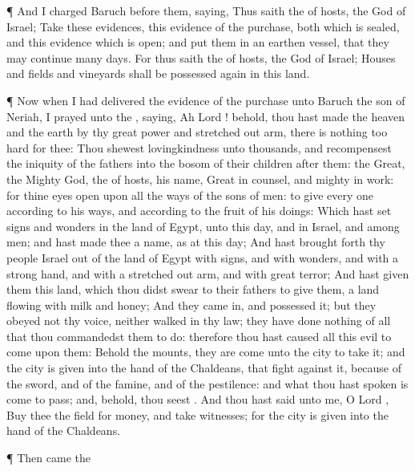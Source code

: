 {\par }{\PP {}¶ And I
charged
Baruch
before them,
saying,
Thus
saith the
{} of
hosts, the
God of
Israel;
Take these
evidences, this
evidence of the
purchase, both which is
sealed, and this
evidence which is
open; and
put them in an
earthen
vessel, that they may
continue
many
days.
For thus
saith the
{} of
hosts, the
God of
Israel;
Houses and
fields and
vineyards shall be possessed
again in this
land.
\par }{\PP {}¶ Now
when I had
delivered the
evidence of the
purchase unto
Baruch the
son of
Neriah, I
prayed unto the
{},
saying,
Ah
Lord
{}! behold, thou hast
made the
heaven and the
earth by thy
great
power and stretched
out
arm,
{} there is
nothing too
hard for thee:
Thou
shewest
lovingkindness unto
thousands, and
recompensest the
iniquity of the
fathers into the
bosom of their
children
after them: the
Great, the
Mighty
God, the
{} of
hosts,
{} his
name,
Great in
counsel, and
mighty in
work: for thine
eyes
{}
open upon all the
ways of the
sons of
men: to
give every
one according to his
ways, and according to the
fruit of his
doings:
Which hast
set
signs and
wonders in the
land of
Egypt,
{} unto this
day, and in
Israel, and among
{}
men; and hast
made thee a
name, as at this
day;
And hast brought
forth thy
people
Israel out of the
land of
Egypt with
signs, and with
wonders, and with a
strong
hand, and with a stretched
out
arm, and with
great
terror;
And hast
given them this
land, which thou didst
swear to their
fathers to
give them, a
land
flowing with
milk and
honey;
And they came
in, and
possessed it; but they
obeyed not thy
voice, neither
walked in thy
law; they have
done nothing of all that thou
commandedst them to
do: therefore thou hast caused all this
evil to
come upon them:
Behold the
mounts, they are
come unto the
city to
take it; and the
city is
given into the
hand of the
Chaldeans, that
fight against it,
because of the
sword, and of the
famine, and of the
pestilence: and what thou hast
spoken is come to pass; and, behold, thou
seest
{}.
And thou hast
said unto me, O
Lord
{},
Buy thee the
field for
money, and
take
witnesses; for the
city is
given into the
hand of the
Chaldeans.
\par }{\PP {}¶ Then came the
}
